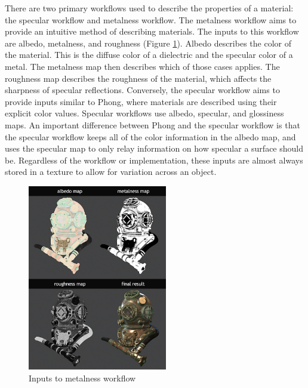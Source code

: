 \documentclass[12pt, letterpaper, twocolumn]{article}
\begin{document}
There are two primary workflows used to describe the properties of a material:
the specular workflow and metalness workflow\cite{MTex}. The metalness
workflow aims to provide an intuitive method of describing materials. The
inputs to this workflow are albedo, metalness, and roughness\cite{MTex}
(Figure \ref{metalwork}). Albedo describes the color of the material. This is
the diffuse color of a dielectric and the specular color of a
metal\cite{MTex}. The metalness map then describes which of those cases
applies\cite{MTex}. The  roughness map describes the roughness of the
material, which affects the sharpness of specular reflections\cite{MTex}.
Conversely, the specular workflow aims to provide inputs similar to Phong,
where materials are described using their explicit color values\cite{MTex}.
Specular workflows use albedo, specular, and glossiness maps\cite{MTex}. An
important difference between Phong and the specular workflow is that the
specular workflow keeps all of the color information in the albedo map, and
uses the specular map to only relay information on how specular a surface
should be\cite{MTex}. Regardless of the workflow or implementation, these
inputs are almost always stored in a texture to allow for variation across an
object.

\begin{figure}
\centering \includegraphics[height=3.2in]{metalness_workflow.jpg}
\caption{Inputs to metalness workflow}
\label{metalwork}
\end{figure}
\end{document}
